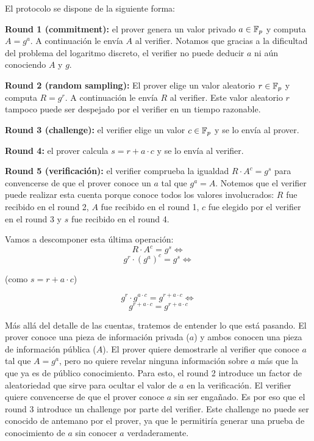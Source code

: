 El protocolo se dispone de la siguiente forma:

\textbf{Round 1 (commitment):} el prover genera un valor privado $a \in \mathbb{F}_p$ y computa $A=g^a$. A continuación le envía $A$ al verifier. Notamos que gracias a la dificultad del problema del logaritmo discreto, el verifier no puede deducir $a$ ni aún conociendo $A$ y $g$. 

\textbf{Round 2 (random sampling):} El prover elige un valor aleatorio $r \in \mathbb{F}_p$ y computa $R=g^r$. A continuación le envía $R$ al verifier. Este valor aleatorio $r$ tampoco puede ser despejado por el verifier en un tiempo razonable. 

\textbf{Round 3 (challenge):} el verifier elige un valor $c \in \mathbb{F}_p$ y se lo envía al prover.

\textbf{Round 4:} el prover calcula $s = r + a\cdot c$ y se lo envía al verifier.

\textbf{Round 5 (verificación):} el verifier comprueba la igualdad $R \cdot A^c = g^s$ para convencerse de que el prover conoce un $a$ tal que $g^a = A$. Notemos que el verifier puede realizar esta cuenta porque conoce todos los valores involucrados: $R$ fue recibido en el round 2, $A$ fue recibido en el round 1, $c$ fue elegido por el verifier en el round 3 y $s$ fue recibido en el round 4.

Vamos a descomponer esta última operación:
$$R \cdot A^c = g^s \Leftrightarrow$$
$$g^r \cdot (g^a)^c = g^s \Leftrightarrow $$

\begin{center}(como $s = r+a\cdot c$)\end{center}
$$g^r \cdot g^{a \cdot c} = g^{r+a\cdot c} \Leftrightarrow$$
$$g^{r+a\cdot c} = g^{r+a\cdot c}$$

Más allá del detalle de las cuentas, tratemos de entender lo que está pasando. El prover conoce una pieza de información privada ($a$) y ambos conocen una pieza de información pública ($A$). El prover quiere demostrarle al verifier que conoce $a$ tal que $A=g^a$, pero no quiere revelar ninguna información sobre $a$ más que la que ya es de público conocimiento. Para esto, el round 2 introduce un factor de aleatoriedad que sirve para ocultar el valor de $a$ en la verificación. El verifier quiere convencerse de que el prover conoce $a$ sin ser engañado.  Es por eso que el round 3 introduce un challenge por parte del verifier. Este challenge no puede ser conocido de antemano por el prover, ya que le permitiría generar una prueba de conocimiento de $a$ sin conocer $a$ verdaderamente. 

